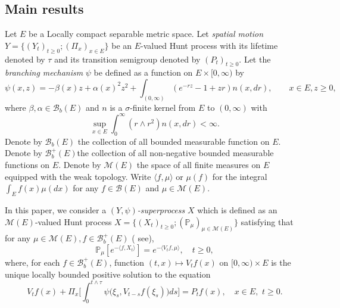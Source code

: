 \documentclass[12pt,a4paper]{amsart}
\theoremstyle{plain}
\theoremstyle{definition}
\numberwithin{equation}{section}
\begin{document}
\subsection{Main results}
\label{sec: main results}
Let $E$ be a Locally compact separable metric space. Let \emph{spatial motion}
$Y=\{(Y_t)_{t\geq 0};(\Pi_x)_{x\in E}\}$ be an $E$-valued Hunt process with its
lifetime denoted by $\tau$ and its transition semigroup denoted by $(P_t)_{t\geq
  0}$. Let the \emph{branching mechanism} $\psi$ be defined as a function on
$E\times[0,\infty)$ by
\[
	\psi(x,z)
	=-\beta(x)z + \alpha(x)^2 z^2+ \int_{(0,\infty)} (e^{-rz}-1+zr )n(x, dr),\qquad x\in E, z\geq0,
\]
where $\beta, \alpha\in \mathcal B_b(E)$ and $n$ is a $\sigma$-finite kernel
from $E$ to $(0,\infty)$ with
\[
	\sup_{x\in E}\int_0^\infty (r\wedge r^2)n(x,dr)
	<\infty.
\]
Denote by $\mathcal B_b(E)$ the collection of all bounded measurable function on
$E$. Denote by $\mathcal B^+_b(E)$the collection of all non-negative bounded
measurable functions on $E$. Denote by $\mathcal M(E)$ the space of all finite
measures on $E$ equipped with the weak topology. Write $\langle f,\mu\rangle$ or
$\mu(f)$ for the integral $\int_E f(x)\mu(dx)$ for any $f\in\mathcal B(E)$ and
$\mu\in \mathcal M(E)$.

In this paper, we consider a \emph{$(Y,\psi)$-superprocess} $X$ which is defined
as an $\mathcal M(E)$-valued Hunt process $X=\{(X_t)_{t\geq 0}; (\mathbb
P_\mu)_{\mu \in \mathcal M(E)}\}$ satisfying that for any $\mu \in \mathcal
M(E), f\in \mathcal B^+_b(E)$ ( see\cite{Dynkin1993Superprocesses}),
\begin{equation} \label{eq: def of vtf}
    \mathbb P_\mu [e^{-\langle f,X_t\rangle}] = e^{-\langle V_tf, \mu\rangle},
    \quad t\geq 0,
\end{equation}
where, for each $f\in\mathcal B^+_b(E)$, function $(t,x) \mapsto V_tf(x)$ on
$[0,\infty) \times E$ is the unique locally bounded positive solution to the
equation
\begin{equation}\label{eq:FKPP_in_definition}
    V_t f(x) +   \Pi_x\Big[\int_0^{t\wedge \tau} \psi \big(\xi_s,V_{t-s} f(\xi_s)\big) ds\Big]
	= P_t f(x),
	\quad x \in E,\,\, t \geq 0.
\end{equation}
\end{document}
